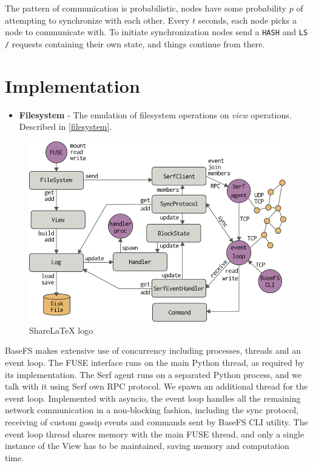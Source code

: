 \documentclass{sig-alternate}
\begin{document}
The pattern of communication is probabilistic, nodes have some probability $p$ of attempting to synchronize with each other. Every $t$ seconds, each node picks a node to communicate with. To initiate synchronization nodes send a \texttt{HASH} and \texttt{LS /} requests containing their own state, and things continue from there.



\section{Implementation}

\begin{itemize}
  \item \textbf{Filesystem} - The emulation of filesystem operations on \textit{view} operations. Described in \ref{filesystem}.
\end{itemize}


\begin{figure}[htp]
\centering
\includegraphics[width=\columnwidth]{imgs/modules.png}
\caption{ShareLaTeX logo}
\label{fig:lion}
\end{figure}


BaseFS makes extensive use of concurrency including processes, threads and an event loop. The FUSE interface runs on the main Python thread, as required by its implementation. The Serf agent runs on a separated Python process, and we talk with it using Serf own RPC protocol. We spawn an additional thread for the event loop. Implemented with asyncio, the event loop handles all the remaining network communication in a non-blocking fashion, including the sync protocol, receiving of custom gossip events and commands sent by BaseFS CLI utility. The event loop thread shares memory with the main FUSE thread, and only a single instance of the View has to be maintained, saving memory and computation time.
\end{document}

